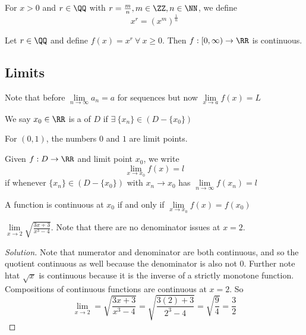 \documentclass[12pt]{scrartcl}
\newcommand{\Lim}{\underset{n\to\infty}{\lim}}
\begin{document}
\begin{definition}
  For $x > 0$ and $r \in \QQ$ with $r = \frac{m}{n}, m \in \ZZ, n \in \NN$, we define 
  \[x^r = (x^m)^{\frac{1}{n}}\]
\end{definition}

\begin{remark}
  Let $r \in \QQ$ and define $f(x) = x^r \ \forall \ x \geq 0$. Then $f: [0, \infty) \to \RR$ is 
  continuous. 
\end{remark}

\subsection{Limits}

\begin{note}
  Note that before $\Lim a_n = a$ for sequences but now $\underset{x\to a}{\lim}f(x) = L$
\end{note}

\begin{definition}
  We say $x_0 \in \RR$ is a  of $D$ if $\exists \ \{x_n\} \in (D - \{x_0\})$
\end{definition}

\begin{example}
  For $(0, 1)$, the numbers $0$ and $1$ are limit points.
\end{example}

\begin{definition}
  Given $f: D \to \RR$ and limit point $x_0$, we write 
  \[\lim_{x\to x_0} f(x) = l\]
  if whenever $\{x_n\} \in (D - \{x_0\})$ with $x_n \to x_0$ has $\Lim f(x_n) = l$
\end{definition}

\begin{remark}
  A function is continuous at $x_0$ if and only if $\underset{x\to x_0}{\lim}f(x) = f(x_0)$
\end{remark}

\begin{example}
  $\underset{x \to 2}{\lim}\sqrt{\frac{3x + 3}{x^3 - 4}}$. Note that there are no 
  denominator issues at $x = 2$. 

  \begin{proof}[Solution]
    Note that numerator and denominator are both continuous, and so the 
    quotient continuous as well because the denominator is also not $0$. 
    Further note htat $\sqrt{x}$ is continuous because it is the inverse 
    of a strictly monotone function. Compositions of continuous functions 
    are continuous at $x=2$. So 
    \[\lim_{x\to2} = \sqrt{\frac{3x+3}{x^3-4}} = \sqrt{\frac{3(2) + 3}{2^3-4}} = \sqrt{\frac{9}{4}} = \frac{3}{2}\]
  \end{proof}
\end{example}
\end{document}
